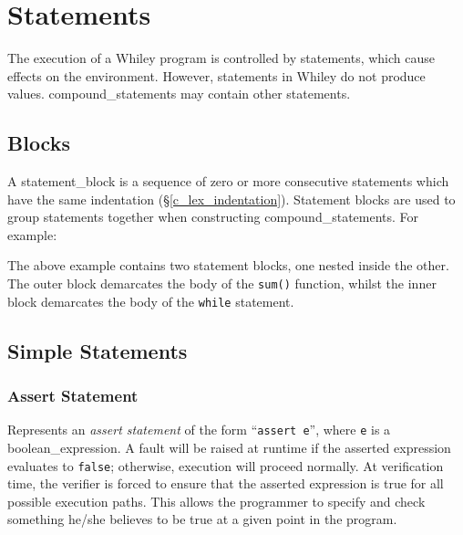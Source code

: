 \chapter{Statements}

The execution of a Whiley program is controlled by \gls{statement}s, which cause effects on the environment.  However, statements in Whiley do not produce values.  \Glspl{compound_statement} may contain other statements.

\section{Blocks}
\label{c_stmts_blocks}

A \gls{statement_block} is a sequence of zero or more consecutive statements which have the same indentation (\S\ref{c_lex_indentation}).  Statement blocks are used to group statements together when constructing \gls{compound_statement}s.  For example:



The above example contains two statement blocks, one nested inside the other.  The outer block demarcates the body of the \lstinline{sum()} function, whilst the inner block demarcates the body of the \lstinline{while} statement.


\section{Simple Statements}


\subsection{Assert Statement}

Represents an {\em assert statement} of the form ``\lstinline{assert e}'', where \lstinline{e} is a \gls{boolean_expression}.  A \gls{fault} will be raised at runtime if the asserted expression evaluates to \lstinline{false}; otherwise, execution will proceed normally.  At verification time, the verifier is forced to ensure that the asserted expression is true for all possible execution paths.  This allows the programmer to specify and check something he/she believes to be true at a given point in the program.

